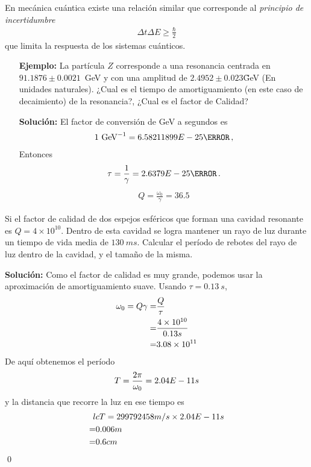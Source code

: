 \begin{frame}
  En mecánica cuántica existe una relación similar que corresponde al \emph{principio de incertidumbre}
\begin{align*}
  \Delta t \Delta E\ge \frac{\hbar}{2}
\end{align*}
que limita la respuesta de los sistemas cuánticos. 
\end{frame}
\begin{itemize}
\item[\textbf{Ejemplo:}] La partícula $Z$ corresponde a una resonancia centrada en $91.1876\pm 0.0021$~GeV y con una amplitud de $2.4952\pm0.023$\~GeV (En unidades naturales). ¿Cual es el tiempo de amortiguamiento (en este caso de decaimiento) de la resonancia?, ¿Cual es el factor de Calidad? 

\item[\textbf{Solución:}] El factor de conversión de GeV  a segundos es
  \begin{align*}
    1\ \text{GeV}^{-1}=\SI{6.58211899E-25}{\second}\,,
  \end{align*}
  Entonces
  \begin{align*}
    \tau=\frac{1}{\gamma}=\SI{2.6379E-25}{\second}\,.
  \end{align*}
  \begin{align*}
    Q=\frac{\omega_0}{\gamma}=36.5
  \end{align*}
\end{itemize}

\ejemplo{} Si el factor de calidad de dos espejos esféricos que forman una cavidad resonante es $Q=4\times 10^{10}$. Dentro de esta cavidad se logra mantener un rayo de luz durante un tiempo de vida media de $\SI{130}{ms}$. Calcular el período de rebotes del rayo de luz dentro de la cavidad, y el tamaño de la misma.

\noindent
\textbf{Solución:} Como el factor de calidad es muy grande, podemos usar la aproximación de amortiguamiento suave. Usando $\tau=\SI{0.13}{s}$,
\begin{align*}
\omega_0=Q\gamma=&\frac{Q}{\tau}\\
=&\frac{\num{4E10}}{0.13s}\\
=&\num{3.08E11}
\end{align*}
De aquí obtenemos el período
\begin{align*}
T=\frac{2\pi}{\omega_0}=2.04E-11s
\end{align*}
y la distancia que recorre la luz en ese tiempo es
\begin{align*}
l&cT=299792458m/s\times2.04E-11s\\
=&0.006m\\
=&0.6cm
\end{align*}
\qed




